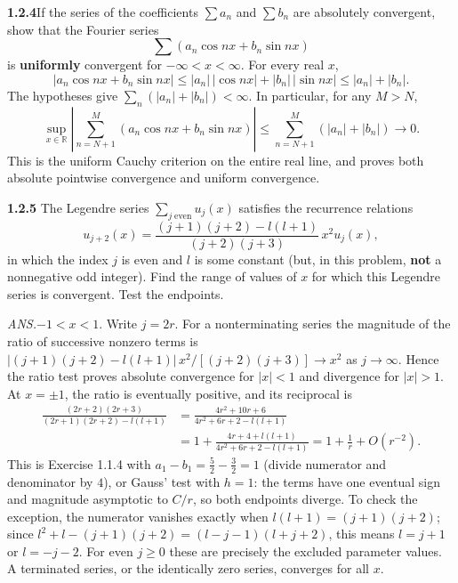 \par\bigskip
\noindent\textbf{1.2.4}\quad If the series of the coefficients $\sum a_{n}$ and
$\sum b_{n}$ are absolutely convergent, show that the Fourier series
\[
\sum\left(a_{n}\cos nx+b_{n}\sin nx\right)
\]
is \textbf{uniformly} convergent for $-\infty<x<\infty$.
\solution
For every real $x$,
\[
 |a_n\cos nx+b_n\sin nx|
 \le |a_n|\,|\cos nx|+|b_n|\,|\sin nx|
 \le |a_n|+|b_n|.
\]
The hypotheses give $\sum_n(|a_n|+|b_n|)<\infty$. In particular,
for any $M>N$,
\[
 \sup_{x\in\mathbb R}\left|\sum_{n=N+1}^M
 (a_n\cos nx+b_n\sin nx)\right|
 \le\sum_{n=N+1}^M(|a_n|+|b_n|)\longrightarrow0.
\]
This is the uniform Cauchy criterion on the entire real line, and proves
both absolute pointwise convergence and uniform convergence.


\par\bigskip
\noindent\textbf{1.2.5}\quad {} The Legendre series $\sum_{j\;\mathrm{even}}u_{j}(x)$
satisfies the recurrence relations
\[
u_{j+2}(x)=\frac{(j+1)(j+2)-l(l+1)}{(j+2)(j+3)}\,x^{2}u_{j}(x),
\]
in which the index $j$ is even and $l$ is some constant (but, in this problem,
\textbf{not} a nonnegative odd integer). Find the range of values of $x$ for
which this Legendre series is convergent. Test the endpoints.
\par\nobreak\hfill\emph{ANS.}\enspace $-1<x<1$.
\solution
{}
Write $j=2r$. For a nonterminating series the magnitude of the ratio of
successive nonzero terms is
$|(j+1)(j+2)-l(l+1)|\,x^2/[(j+2)(j+3)]\to x^2$ as $j\to\infty$.
Hence the ratio test proves
absolute convergence for $|x|<1$ and divergence for $|x|>1$.
At $x=\pm1$, the ratio is eventually positive, and its reciprocal is
\[
 \begin{aligned}
 \frac{(2r+2)(2r+3)}{(2r+1)(2r+2)-l(l+1)}
 &=\frac{4r^2+10r+6}{4r^2+6r+2-l(l+1)}\\
 &=1+\frac{4r+4+l(l+1)}{4r^2+6r+2-l(l+1)}
 =1+\frac1r+O(r^{-2}).
 \end{aligned}
\]
This is Exercise 1.1.4 with $a_1-b_1=\frac52-\frac32=1$ (divide
numerator and denominator by $4$), or Gauss' test with $h=1$: the terms
have one eventual sign and magnitude asymptotic to $C/r$, so both
endpoints diverge.
To check the exception, the numerator vanishes exactly when
$l(l+1)=(j+1)(j+2)$; since
$l^2+l-(j+1)(j+2)=(l-j-1)(l+j+2)$, this means $l=j+1$ or $l=-j-2$.
For even $j\ge0$ these are precisely the excluded parameter values.
A terminated series, or the identically zero series, converges for all $x$.


